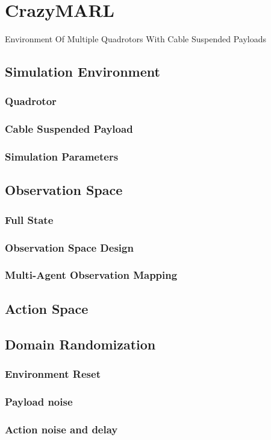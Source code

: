 \chapter{CrazyMARL}
Environment Of Multiple Quadrotors With Cable Suspended Payloads
\section{Simulation Environment}

\subsection{Quadrotor}
\subsection{Cable Suspended Payload}
\subsection{Simulation Parameters}

\section{Observation Space}
\subsection{Full State}
\subsection{Observation Space Design}
\subsection{Multi-Agent Observation Mapping}

\section{Action Space}

\section{Domain Randomization}

\subsection{Environment Reset}
\subsection{Payload noise}
\subsection{Action noise and delay}
